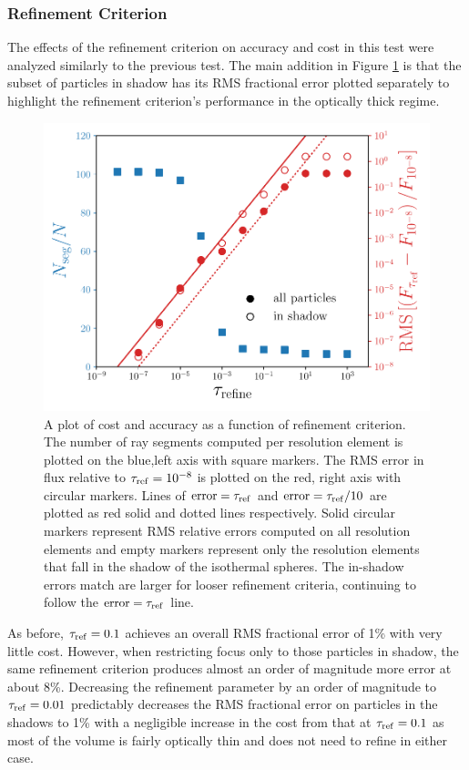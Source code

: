 \documentclass[fleq,usenatbib]{mnras}
\newcommand{\tr}{\tau_{\rm ref}}
\begin{document}
{\subsubsection{Refinement Criterion}
The effects of the refinement criterion on accuracy and cost in this test were 
analyzed similarly to the previous test. The main addition in Figure 
\ref{fig:isosph} is that the subset of particles in shadow has its RMS 
fractional error plotted separately to highlight the refinement criterion's 
performance in the optically thick regime.
\begin{figure}
\includegraphics[width=1\linewidth]{Figures/isothermal_spheres.pdf}
\caption{A plot of cost and accuracy as a function of refinement criterion. 
The number of ray segments computed per resolution element is plotted on the 
blue,left axis with square markers. The RMS error in flux relative to $\tr
=10^{-8}$ is plotted on the red, right axis with circular markers. Lines of 
${\rm error} = \tr$ and ${\rm error} = \tr/10$ are plotted as red solid and dotted 
lines respectively. Solid circular markers represent RMS relative errors 
computed on all resolution elements and empty markers represent only the 
resolution elements that fall in the shadow of the isothermal spheres. The 
in-shadow errors match are larger for looser refinement criteria,
continuing to follow the ${\rm error} = \tr$ line.}
\label{fig:isosph}
\end{figure}
As before, $\tr=0.1$ achieves an overall RMS fractional error of 1\% with very 
little cost. However, when restricting focus only to those particles in 
shadow, the same refinement criterion produces almost an order of magnitude 
more error at about 8\%. Decreasing the refinement parameter by an order of 
magnitude to $\tr=0.01$ predictably decreases the RMS fractional error on 
particles in the shadows to 1\% with a negligible increase in the cost from 
that at $\tr=0.1$ as most of the volume is fairly optically thin and does
not need to refine in either case.

}
\end{document}
